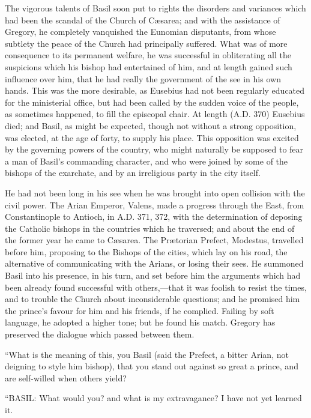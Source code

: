 The vigorous talents of Basil soon put to rights the disorders and
variances which had been the scandal of the Church of Cæsarea; and
with the assistance of Gregory, he completely vanquished the Eunomian
disputants, from whose subtlety the peace of the Church had
principally suffered. What was of more consequence to its permanent
welfare, he was successful in obliterating all the suspicions which
his bishop had entertained of him, and at length gained such influence
over him, that he had really the government of the see in his own
hands. This was the more desirable, as Eusebius had not been regularly
educated for the ministerial office, but had been called by the sudden
voice of the people, as sometimes happened, to fill the episcopal
chair. At length (A.D. 370) Eusebius died; and
Basil, as might be expected, though not without a strong
opposition, was elected, at the age of forty, to supply his place.
This opposition was excited by the governing powers of the country,
who might naturally be supposed to fear a man of Basil's commanding
character, and who were joined by some of the bishops of the
exarchate, and by an irreligious party in the city itself.

He had not been long in his see when he was brought into open
collision with the civil power. The Arian Emperor, Valens, made a
progress through the East, from Constantinople to Antioch, in A.D.
371, 372, with the determination of deposing the Catholic bishops in
the countries which he traversed; and about the end of the former year
he came to Cæsarea. The Prætorian Prefect, Modestus, travelled
before him, proposing to the Bishops of the cities, which lay on his
road, the alternative of communicating with the Arians, or losing
their sees. He summoned Basil into his presence, in his turn, and set
before him the arguments which had been already found successful with
others,—that it was foolish to resist the times, and to trouble the
Church about inconsiderable questions; and he promised him the prince's
favour for him and his friends, if he complied. Failing by soft
language, he adopted a higher tone; but he found his match. Gregory
has preserved the dialogue which passed between them.

``What is the meaning of this, you Basil (said the Prefect, a
bitter Arian, not deigning to style him bishop), that you stand out
against so great a prince, and are self-willed when others yield?

``BASIL: What would you? and what is my extravagance? I have
not yet learned it.

